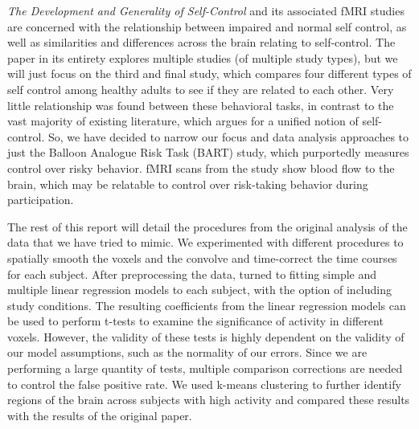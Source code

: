 \par \textit{The Development and Generality of Self-Control} \cite
{CohenSelfControl} and its associated fMRI studies are concerned with the 
relationship between impaired and normal self control, as well as 
similarities and differences across the brain relating to self-control. The 
paper in its entirety explores multiple studies (of multiple study types), 
but we will just focus on the third and final study, which compares four 
different types of self control among healthy adults to see if they are 
related to each other. Very little relationship was found between these 
behavioral tasks, in contrast to the vast majority of existing literature, 
which argues for a unified notion of self-control. So, we have decided to 
narrow our focus and data analysis approaches to just the Balloon Analogue 
Risk Task (BART) study, which purportedly measures control over risky 
behavior. fMRI scans from the study show blood flow to the brain, which may 
be relatable to control over risk-taking behavior during participation.

\par The rest of this report will detail the procedures from the original 
analysis of the data that we have tried to mimic. We experimented with 
different procedures to spatially smooth the voxels and the convolve and 
time-correct the time courses for each subject. After preprocessing the data, 
turned to fitting simple and multiple linear regression models to each subject, 
with the option of including study conditions. The resulting coefficients from 
the linear regression models can be used to perform t-tests to examine the 
significance of activity in different voxels. However, the validity of these 
tests is highly dependent on the validity of our model assumptions, such as the 
normality of our errors. Since we are performing a large quantity of tests, 
multiple comparison corrections are needed to control the false positive rate. 
We used k-means clustering to further identify regions of the brain across 
subjects with high activity and compared these results with the results of the 
original paper. 

